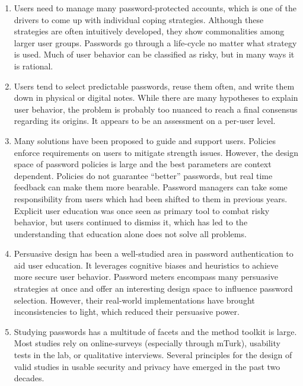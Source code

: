 \begin{enumerate}
	\item Users need to manage many password-protected accounts, which is one of the drivers to come up with individual coping strategies. Although these strategies are often intuitively developed, they show commonalities among larger user groups. Passwords go through a life-cycle no matter what strategy is used. Much of user behavior can be classified as risky, but in many ways it is rational.
	\item Users tend to select predictable passwords, reuse them often, and write them down in physical or digital notes. While there are many hypotheses to explain user behavior, the problem is probably too nuanced to reach a final consensus regarding its origins. It appears to be an assessment on a per-user level.
	\item Many solutions have been proposed to guide and support users. Policies enforce requirements on users to mitigate strength issues. However, the design space of password policies is large and the best parameters are context dependent. Policies do not guarantee ``better'' passwords, but real time feedback can make them more bearable. Password managers can take some responsibility from users which had been shifted to them in previous years. Explicit user education was once seen as primary tool to combat risky behavior, but users continued to dismiss it, which has led to the understanding that education alone does not solve all problems.
	\item Persuasive design has been a well-studied area in password authentication to aid user education. It leverages cognitive biases and heuristics to achieve more secure user behavior. Password meters encompass many persuasive strategies at once and offer an interesting design space to influence password selection. However, their real-world implementations have brought inconsistencies to light, which reduced their persuasive power. 
	\item Studying passwords has a multitude of facets and the method toolkit is large. Most studies rely on online-surveys (especially through \gls{mTurk}), usability tests in the lab, or qualitative interviews. Several principles for the design of valid studies in usable security and privacy have emerged in the past two decades. 
\end{enumerate}


